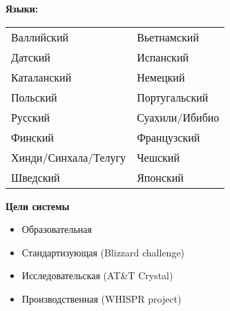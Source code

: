 \documentclass{seminar}
\begin{document}
\begin{slide}
\textbf{Языки:}

\begin{tabular}{ll}
Валлийский & Вьетнамский \\
Датский & Испанский  \\
Каталанский & Немецкий \\
Польский & Португальский \\
Русский & Суахили/Ибибио \\
Финский & Французский \\
Хинди/Синхала/Телугу & Чешский \\
Шведский & Японский
\end{tabular}
\end{slide}

\begin{slide}
{\bf Цели системы}
\begin{itemize}
\item Образовательная
\item Стандартизующая (Blizzard challenge)
\item Исследовательская (AT\&T Crystal)
\item Производственная (WHISPR project)
\end{itemize}
\end{slide}                    
\end{document}
